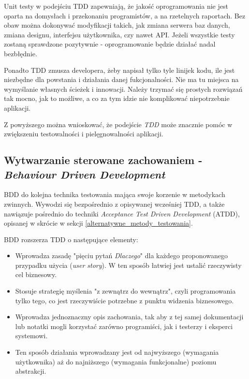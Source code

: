 Unit testy w podejściu TDD zapewniają, że jakość oprogramowania nie jest oparta na domysłach i przekonaniu programistów, a na rzetelnych raportach. Bez obaw można dokonywać modyfikacji takich, jak zmiana serwera baz danych, zmiana designu, interfejsu użytkownika, czy nawet API. Jeżeli wszystkie testy zostaną sprawdzone pozytywnie - oprogramowanie będzie działać nadal bezbłędnie.

Ponadto TDD zmusza developera, żeby napisał tylko tyle linijek kodu, ile jest niezbędne dla powstania i działania danej fukcjonalności. Nie ma tu miejsca na wymyślanie własnych ścieżek i innowacji. Należy trzymać się prostych rozwiązań tak mocno, jak to możliwe, a co za tym idzie nie komplikować niepotrzebnie aplikacji.

Z powyższego można wnioskować, że podejście \textit{TDD} może znacznie pomóc w zwiększeniu testowalności i pielęgnowalności aplikacji. 

\subsection{Wytwarzanie sterowane zachowaniem - \textit{Behaviour Driven Development}}
\label{behaviour_driven_development}
BDD do kolejna technika testowania mająca swoje korzenie w metodykach zwinnych. Wywodzi się bezpośrednio z opisywanej wcześniej TDD, a także  nawiązuje pośrednio do techniki \textit{Acceptance Test Driven Development} (ATDD), opisanej w skrócie w sekcji \ref{alternatywne_metody_testowania}.

BDD rozszerza TDD o następujące elementy:
\begin{itemize}
\item
Wprowadza zasadę "pięciu pytań \textit{Dlaczego}" dla każdego proponowanego przypadku użycia (\textit{user story}). W ten sposób łatwiej jest ustalić rzeczywisty cel biznesowy.

\item
Stosuje strategię myślenia "z zewnątrz do wewnątrz", czyli programowania tylko tego, co jest rzeczywiście potrzebne z punktu widzenia biznesowego.

\item
Wprowadza jednoznaczny opis zachowania, tak aby z tej samej dokumentacji lub notatki mogli korzystać zarówno programiści, jak i testerzy i eksperci systemowi.

\item
Ten sposób działania wprowadzany jest od najwyższego (wymagania użytkownika) aż do najniższego (wymagania funkcjonalne) poziomu abstrakcji.

\end{itemize}

